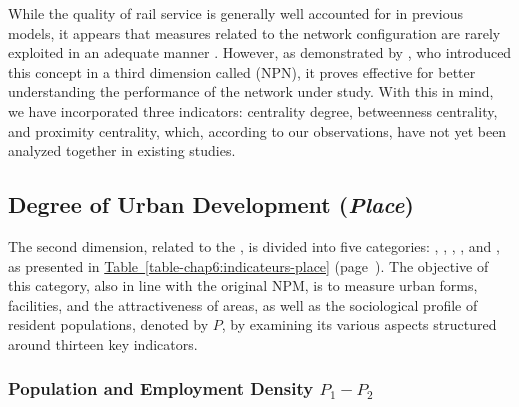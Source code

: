 \begin{refsegment}
While the quality of rail service is generally well accounted for in previous models, it appears that measures related to the network configuration are rarely exploited in an adequate manner \textcolor{blue}{\autocite[72-74]{papa_accessibility_2015}}. However, as demonstrated by \textcolor{blue}{\textcite[8]{dou_integrating_2021}}, who introduced this concept in a third dimension called  (NPN), it proves effective for better understanding the performance of the network under study. With this in mind, we have incorporated three indicators: centrality degree, betweenness centrality, and proximity centrality, which, according to our observations, have not yet been analyzed together in existing studies.%

\subsection{Degree of Urban Development (\textsl{Place})
    \label{chap6:methodologie-indicateurs-place}
    }

The second dimension, related to the , is divided into five categories: , , , , and , as presented in \hyperref[table-chap6:indicateurs-place]{Table~\ref{table-chap6:indicateurs-place}} (page~\pageref{table-chap6:indicateurs-place}). The objective of this category, also in line with the original \acrshort{NPM}, is to measure urban forms, facilities, and the attractiveness of areas, as well as the sociological profile of resident populations, denoted by \(P\), by examining its various aspects structured around thirteen key indicators.%


\subsubsection*{Population and Employment Density \(P_{1} - P_{2}\)
    \label{chap6:indicateurs-place-densite}
    }


\end{refsegment}
